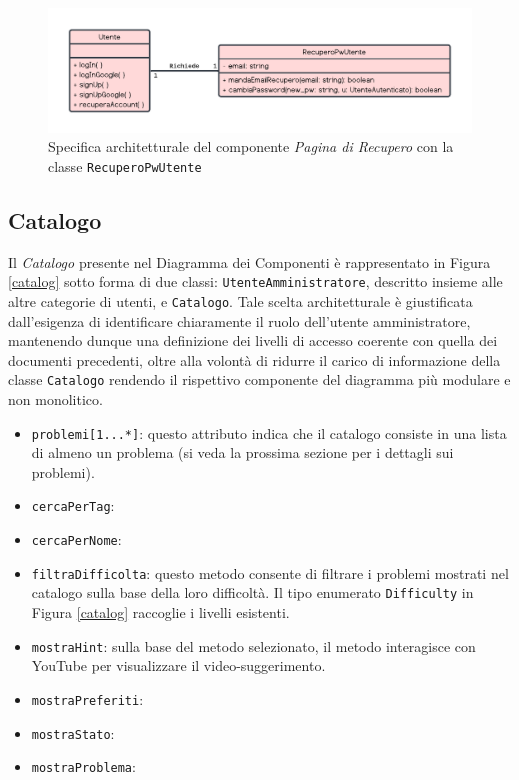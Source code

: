 \documentclass[11pt, a4paper]{article}
\theoremstyle{definition} %
\begin{document}
\begin{figure}[H]
\centering
\hspace*{-1.5cm}
\includegraphics[scale = 0.8]{materiale/class-recupero.pdf}
\caption{Specifica architetturale del componente \textit{Pagina di Recupero} con la classe \texttt{RecuperoPwUtente}}
\label{recupero}
\end{figure}



\newpage
\subsection{Catalogo}
Il \textit{Catalogo} presente nel Diagramma dei Componenti è rappresentato in
Figura \ref{catalog} sotto forma di due classi: \texttt{UtenteAmministratore}, descritto insieme
alle altre categorie di utenti, e \texttt{Catalogo}. Tale scelta architetturale
è giustificata dall'esigenza di identificare chiaramente il ruolo dell'utente
amministratore, mantenendo dunque una definizione dei livelli di accesso
coerente con quella dei documenti precedenti, oltre alla volontà di ridurre il
carico di informazione della classe \texttt{Catalogo} rendendo il rispettivo
componente del diagramma più modulare e non monolitico.
\begin{itemize}
    \item \texttt{problemi[1...*]}: questo attributo indica che il catalogo
    consiste in una lista di almeno un problema (si veda la prossima sezione
    per i dettagli sui problemi).
    
    \item \texttt{cercaPerTag}:
    \item \texttt{cercaPerNome}:
    \item \texttt{filtraDifficolta}: questo metodo consente di filtrare i
    problemi mostrati nel catalogo sulla base della loro difficoltà. Il
    tipo enumerato \texttt{Difficulty} in Figura \ref{catalog}
    raccoglie i livelli esistenti.

    \item \texttt{mostraHint}: sulla base del metodo selezionato, il metodo
    interagisce con YouTube per visualizzare il video-suggerimento.

    \item \texttt{mostraPreferiti}:
    \item \texttt{mostraStato}:
    \item \texttt{mostraProblema}:
\end{itemize}
\end{document}
